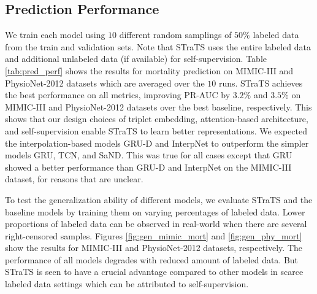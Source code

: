 \subsection{Prediction Performance}
We train each model using $10$ different random samplings of $50\%$ labeled data from the train and validation sets. Note that STraTS uses the entire labeled data and additional unlabeled data (if available) for self-supervision. 
Table \ref{tab:pred_perf} shows the results for mortality prediction on MIMIC-III and PhysioNet-2012 datasets which are averaged over the $10$ runs. 
STraTS achieves the best performance on all metrics, improving PR-AUC by $3.2\%$ and $3.5\%$ on MIMIC-III and PhysioNet-2012 datasets over the best baseline,  respectively. This shows that our design choices of triplet embedding, attention-based architecture, and self-supervision enable STraTS to learn better representations.
We expected the interpolation-based models GRU-D and InterpNet to outperform the simpler models GRU, TCN, and SaND. This was true for all cases except that GRU showed a better performance than GRU-D and InterpNet on the MIMIC-III dataset, for reasons that are unclear.


To test the generalization ability of different models, we evaluate STraTS and the baseline models by training them on varying percentages of labeled data. Lower proportions of labeled data can be observed in real-world when there are several right-censored samples.
Figures \ref{fig:gen_mimic_mort} and \ref{fig:gen_phy_mort} show the results for MIMIC-III and PhysioNet-2012 datasets, respectively. The performance of all models degrades with reduced amount of labeled data. But STraTS is seen to have a crucial advantage compared to other models in scarce labeled data settings which can be attributed to self-supervision.


